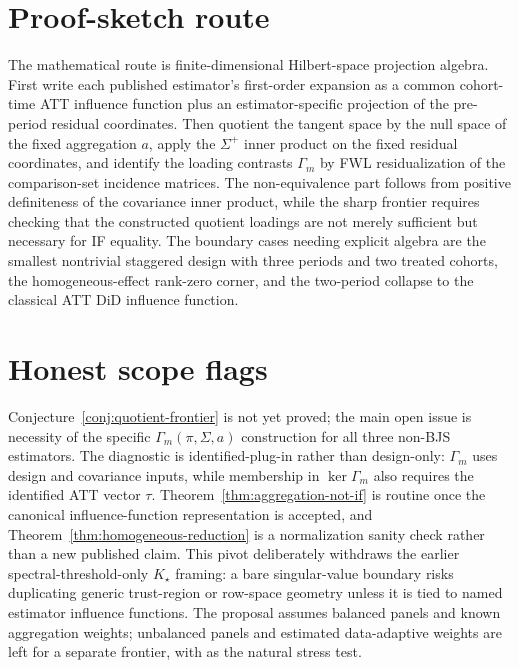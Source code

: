 \documentclass[11pt]{article}
\theoremstyle{definition}
\theoremstyle{plain}
\theoremstyle{remark}
\begin{document}
\section{Proof-sketch route}
The mathematical route is finite-dimensional Hilbert-space projection algebra.  First write each
published estimator's first-order expansion as a common cohort-time ATT influence function plus an
estimator-specific projection of the pre-period residual coordinates.  Then quotient the tangent
space by the null space of the
fixed aggregation \(a\), apply the \(\Sigma^{+}\) inner product on the fixed residual coordinates,
and identify the loading contrasts
\(\Gamma_m\) by FWL residualization of the comparison-set incidence matrices.  The non-equivalence
part follows from positive definiteness of the covariance inner product, while the sharp frontier
requires checking that the constructed quotient loadings are not merely sufficient but necessary for
IF equality.  The boundary cases needing explicit algebra are the smallest nontrivial staggered design
with three periods and two treated cohorts, the homogeneous-effect rank-zero corner, and the two-period
collapse to the classical ATT DiD influence function.

\section{Honest scope flags}
Conjecture~\ref{conj:quotient-frontier} is not yet proved; the main open issue is necessity of the
specific \(\Gamma_m(\pi,\Sigma,a)\) construction for all three non-BJS estimators.  The diagnostic is
identified-plug-in rather than design-only: \(\Gamma_m\) uses design and covariance inputs, while
membership in \(\ker\Gamma_m\) also requires the identified ATT vector \(\tau\).  Theorem~\ref{thm:aggregation-not-if}
is routine once the canonical influence-function representation is accepted, and
Theorem~\ref{thm:homogeneous-reduction} is a normalization sanity check rather than a new published
claim.  This pivot deliberately withdraws the earlier spectral-threshold-only \(K_\star\) framing:
a bare singular-value boundary risks duplicating generic trust-region or row-space geometry unless it
is tied to named estimator influence functions.  The proposal assumes balanced panels and known
aggregation weights; unbalanced panels and estimated data-adaptive weights are left for a separate
frontier, with \citet{BellegoBenatiaDortetBernadet2025} as the natural stress test.
\end{document}
